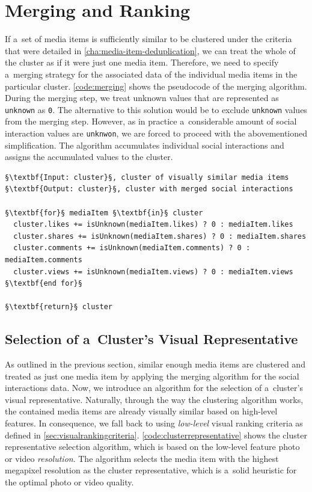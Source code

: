 \section{Merging and Ranking}
\label{sec:merging-social-interactions}

If a~set of media items is sufficiently similar to be clustered
under the criteria that were detailed in
\autoref{cha:media-item-deduplication},
we can treat the whole of the cluster
as if it were just one media item.
Therefore, we need to specify a~merging strategy
for the associated data of the individual media items
in the particular cluster.
\autoref{code:merging} shows the pseudocode of the merging algorithm.
During the merging step, we treat unknown values
that are represented as \texttt{unknown} as \texttt{0}.
The alternative to this solution would be to exclude \texttt{unknown} values
from the merging step.
However, as in practice a~considerable amount of
social interaction values are \texttt{unknwon},
we are forced to proceed with the abovementioned simplification.
The algorithm accumulates individual social interactions
and assigns the accumulated values to the cluster.

\begin{lstlisting}[caption=Social interactions merging algorithm,
  label=code:merging, float=!ht, escapechar=§]
§\textbf{Input: cluster}§, cluster of visually similar media items 
§\textbf{Output: cluster}§, cluster with merged social interactions 

§\textbf{for}§ mediaItem §\textbf{in}§ cluster
  cluster.likes += isUnknown(mediaItem.likes) ? 0 : mediaItem.likes
  cluster.shares += isUnknown(mediaItem.shares) ? 0 : mediaItem.shares
  cluster.comments += isUnknown(mediaItem.comments) ? 0 : mediaItem.comments
  cluster.views += isUnknown(mediaItem.views) ? 0 : mediaItem.views
§\textbf{end for}§

§\textbf{return}§ cluster
\end{lstlisting}

\subsection{Selection of a~Cluster's Visual Representative}  

As outlined in the previous section, similar enough media items
are clustered and treated as just one media item
by applying the merging algorithm for the social interactions data.
Now, we introduce an algorithm for the selection of
a~cluster's visual representative.
Naturally, through the way the clustering algorithm works,
the contained media items are already visually similar
based on high-level features. 
In consequence, we fall back to using \emph{low-level}
visual ranking criteria as defined in \autoref{sec:visualrankingcriteria}.
\autoref{code:clusterrepresentative} shows the cluster representative
selection algorithm, which is based on the low-level feature photo or video \emph{resolution}.
The algorithm selects the media item with the highest megapixel resolution
as the cluster representative,
which is a~solid heuristic for the optimal photo or video quality.

